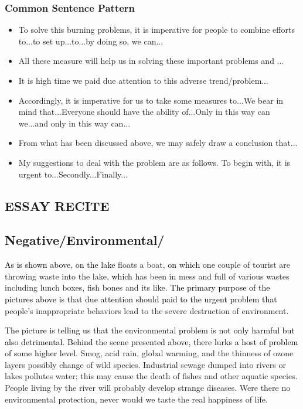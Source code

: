 \documentclass{article}
\begin{document}
\subsubsection{Common Sentence Pattern}
\label{sec:comm-beginn-sent-3}
\begin{itemize}
\item To solve this burning problems, it is imperative for people to combine efforts to...to set up...to...by doing so, we can...
\item All these measure will help us in solving these important problems and ...
\item It is high time we paid due attention to this adverse trend/problem...
\item Accordingly, it is imperative for us to take some measures to...We bear in mind
  that...Everyone should have the ability of...Only in this way can we...and only in this
  way can...
\item From what has been discussed above, we may safely draw a conclusion that...
\item My suggestions to deal with the problem are as follows. To begin with, it is urgent
  to...Secondly...Finally...
\end{itemize}



\begin{center}
  \section{ESSAY RECITE}
\label{sec:essay}
\end{center}

\subsection{Negative/Environmental/}
\label{sec:negative}

\hspace{0.5cm}\textcolor{black}{As is shown above}, \textcolor{black}{on the lake }floats a
boat, \textcolor{black}{on which one }couple of tourist are throwing waste into the lake,
\textcolor{black}{which} has been in mess and full of various wastes including lunch boxes,
fish bones and its like. \textcolor{black}{The primary purpose of the pictures above is that
due attention should paid to the urgent problem that }people's inappropriate behaviors
lead to the severe destruction of environment.

\par \textcolor{black}{The picture is telling us that} the environmental \textcolor{black}{problem is 
not only harmful but also detrimental}. \textcolor{black}{Behind the scene presented above,
there lurks a host of problem of some higher level}. Smog, acid rain, global warming, and
the thinness of ozone layers possibly change of wild species. Industrial sewage dumped
into rivers or lakes pollutes water; this may cause the death of fishes and other aquatic
species. People living by the river will probably develop strange diseases. Were there no
environmental protection, never would we taste the real happiness of life.
\end{document}
